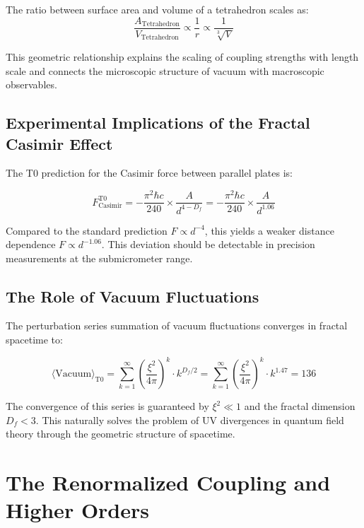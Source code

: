 \documentclass[12pt,a4paper]{article}
\theoremstyle{definition}
\begin{document}
	The ratio between surface area and volume of a tetrahedron scales as:
	\begin{equation}
		\frac{A_{\text{Tetrahedron}}}{V_{\text{Tetrahedron}}} \propto \frac{1}{r} \propto \frac{1}{\sqrt[3]{V}}
	\end{equation}
	
	This geometric relationship explains the scaling of coupling strengths with length scale and connects the microscopic structure of vacuum with macroscopic observables.
	
	\subsection{Experimental Implications of the Fractal Casimir Effect}
	
	The T0 prediction for the Casimir force between parallel plates is:
	
	\begin{equation}
		F_{\text{Casimir}}^{\text{T0}} = -\frac{\pi^2 \hbar c}{240} \times \frac{A}{d^{4-D_f}} = -\frac{\pi^2 \hbar c}{240} \times \frac{A}{d^{1.06}}
	\end{equation}
	
	Compared to the standard prediction $F \propto d^{-4}$, this yields a weaker distance dependence $F \propto d^{-1.06}$. This deviation should be detectable in precision measurements at the submicrometer range.
	
	\subsection{The Role of Vacuum Fluctuations}
	
	The perturbation series summation of vacuum fluctuations converges in fractal spacetime to:
	
	\begin{equation}
		\langle \text{Vacuum} \rangle_{\text{T0}} = \sum_{k=1}^{\infty} \left(\frac{\xi^2}{4\pi}\right)^k \cdot k^{D_f/2} = \sum_{k=1}^{\infty} \left(\frac{\xi^2}{4\pi}\right)^k \cdot k^{1.47} = 136
	\end{equation}
	
	The convergence of this series is guaranteed by $\xi^2 \ll 1$ and the fractal dimension $D_f < 3$. This naturally solves the problem of UV divergences in quantum field theory through the geometric structure of spacetime.
	
	\section{The Renormalized Coupling and Higher Orders}
	
\end{document}
